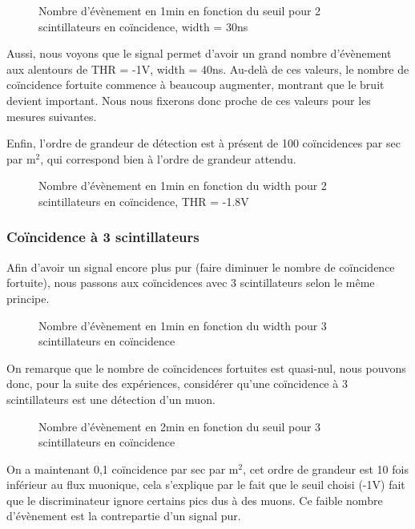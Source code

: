 \documentclass[a4paper,12pt,twoside]{article}
\begin{document}
\begin{figure}[ht!]
    \centering
    \caption[Nombre d’évènement en 1min en fonction du seuil]{Nombre d’évènement en 1min en fonction du seuil pour 2 scintillateurs en coïncidence, width = 30ns}
\end{figure}

Aussi, nous voyons que le signal permet d’avoir un grand nombre d’évènement aux alentours de THR = -1V, width = 40ns. Au-delà de ces valeurs, le nombre de coïncidence fortuite commence à beaucoup augmenter, montrant que le bruit devient important. Nous nous fixerons donc proche de ces valeurs pour les mesures suivantes.

Enfin, l’ordre de grandeur de détection est à présent de 100 coïncidences par sec par m$^2$, qui correspond bien à l’ordre de grandeur attendu.

\begin{figure}[h!]
    \centering
    \caption{Nombre d’évènement en 1min en fonction du width pour 2 scintillateurs en coïncidence, THR = -1.8V}
\end{figure}

\subsubsection{Coïncidence à 3 scintillateurs}
Afin d’avoir un signal encore plus pur (faire diminuer le nombre de coïncidence fortuite), nous passons aux coïncidences avec 3 scintillateurs selon le même principe.

\begin{figure}[h!]
    \centering
    \caption{Nombre d’évènement en 1min en fonction du width pour 3 scintillateurs en coïncidence}
\end{figure}

On remarque que le nombre de coïncidences fortuites est quasi-nul, nous pouvons donc, pour la suite des expériences, considérer qu’une coïncidence à 3 scintillateurs est une détection d’un muon.

\begin{figure}[h!]
    \centering
    \caption{Nombre d’évènement en 2min en fonction du seuil pour 3 scintillateurs en coïncidence}
\end{figure}

On a maintenant 0,1 coïncidence par sec par m$^2$, cet ordre de grandeur est 10 fois inférieur au flux muonique, cela s’explique par le fait que le seuil choisi (-1V) fait que le discriminateur ignore certains pics dus à des muons. Ce faible nombre d’évènement est la contrepartie d’un signal pur.
\end{document}

